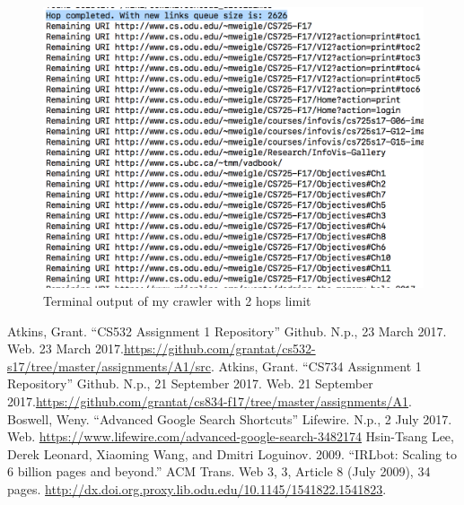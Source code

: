 \documentclass[letterpaper,11pt]{article}
\begin{document}
\begin{figure}[h]
\centering
\includegraphics[scale=0.43]{hop2.png}
\caption{Terminal output of my crawler with 2 hops limit}
\label{fig:hop2}
\end{figure}


\clearpage



\begin{thebibliography}{9}
Atkins, Grant. ``CS532 Assignment 1 Repository'' Github. N.p., 23 March 2017. Web. 23 March 2017.\url{https://github.com/grantat/cs532-s17/tree/master/assignments/A1/src}.
Atkins, Grant. ``CS734 Assignment 1 Repository'' Github. N.p., 21 September 2017. Web. 21 September 2017.\url{https://github.com/grantat/cs834-f17/tree/master/assignments/A1}.
Boswell, Weny. ``Advanced Google Search Shortcuts'' Lifewire. N.p., 2 July 2017. Web. \url{https://www.lifewire.com/advanced-google-search-3482174}
Hsin-Tsang Lee, Derek Leonard, Xiaoming Wang, and Dmitri Loguinov. 2009. ``IRLbot: Scaling to 6 billion pages and beyond.'' ACM Trans. Web 3, 3, Article 8 (July 2009), 34 pages. \url{http://dx.doi.org.proxy.lib.odu.edu/10.1145/1541822.1541823}.
\end{thebibliography}
\end{document}
